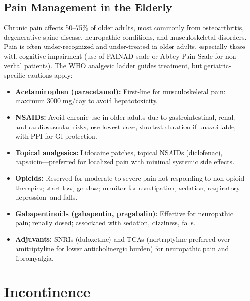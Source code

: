 \subsection{Pain Management in the Elderly}
\label{sec:Pain Management in the Elderly}

Chronic pain affects 50--75\% of older adults, most commonly from osteoarthritis, degenerative spine disease, neuropathic conditions, and musculoskeletal disorders. Pain is often under-recognized and under-treated in older adults, especially those with cognitive impairment (use of PAINAD scale or Abbey Pain Scale for non-verbal patients). The WHO analgesic ladder guides treatment, but geriatric-specific cautions apply:
\begin{itemize}[noitemsep]
  \item \textbf{Acetaminophen (paracetamol):} First-line for musculoskeletal pain; maximum 3000 mg/day to avoid hepatotoxicity.
  \item \textbf{NSAIDs:} Avoid chronic use in older adults due to gastrointestinal, renal, and cardiovascular risks; use lowest dose, shortest duration if unavoidable, with PPI for GI protection.
  \item \textbf{Topical analgesics:} Lidocaine patches, topical NSAIDs (diclofenac), capsaicin---preferred for localized pain with minimal systemic side effects.
  \item \textbf{Opioids:} Reserved for moderate-to-severe pain not responding to non-opioid therapies; start low, go slow; monitor for constipation, sedation, respiratory depression, and falls.
  \item \textbf{Gabapentinoids (gabapentin, pregabalin):} Effective for neuropathic pain; renally dosed; associated with sedation, dizziness, falls.
  \item \textbf{Adjuvants:} SNRIs (duloxetine) and TCAs (nortriptyline preferred over amitriptyline for lower anticholinergic burden) for neuropathic pain and fibromyalgia.
\end{itemize}

\section{Incontinence}


